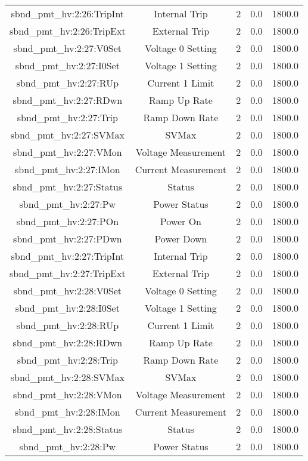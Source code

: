 \begin{center}
\begin{longtable}{c | c c c c }
sbnd\_pmt\_hv:2:26:TripInt & Internal Trip & 2 & 0.0 & 1800.0\\ 
sbnd\_pmt\_hv:2:26:TripExt & External Trip & 2 & 0.0 & 1800.0\\ 
sbnd\_pmt\_hv:2:27:V0Set & Voltage 0 Setting & 2 & 0.0 & 1800.0\\ 
sbnd\_pmt\_hv:2:27:I0Set & Voltage 1 Setting & 2 & 0.0 & 1800.0\\ 
sbnd\_pmt\_hv:2:27:RUp & Current 1 Limit & 2 & 0.0 & 1800.0\\ 
sbnd\_pmt\_hv:2:27:RDwn & Ramp Up Rate & 2 & 0.0 & 1800.0\\ 
sbnd\_pmt\_hv:2:27:Trip & Ramp Down Rate & 2 & 0.0 & 1800.0\\ 
sbnd\_pmt\_hv:2:27:SVMax & SVMax & 2 & 0.0 & 1800.0\\ 
sbnd\_pmt\_hv:2:27:VMon & Voltage Measurement & 2 & 0.0 & 1800.0\\ 
sbnd\_pmt\_hv:2:27:IMon & Current Measurement & 2 & 0.0 & 1800.0\\ 
sbnd\_pmt\_hv:2:27:Status & Status & 2 & 0.0 & 1800.0\\ 
sbnd\_pmt\_hv:2:27:Pw & Power Status & 2 & 0.0 & 1800.0\\ 
sbnd\_pmt\_hv:2:27:POn & Power On & 2 & 0.0 & 1800.0\\ 
sbnd\_pmt\_hv:2:27:PDwn & Power Down & 2 & 0.0 & 1800.0\\ 
sbnd\_pmt\_hv:2:27:TripInt & Internal Trip & 2 & 0.0 & 1800.0\\ 
sbnd\_pmt\_hv:2:27:TripExt & External Trip & 2 & 0.0 & 1800.0\\ 
sbnd\_pmt\_hv:2:28:V0Set & Voltage 0 Setting & 2 & 0.0 & 1800.0\\ 
sbnd\_pmt\_hv:2:28:I0Set & Voltage 1 Setting & 2 & 0.0 & 1800.0\\ 
sbnd\_pmt\_hv:2:28:RUp & Current 1 Limit & 2 & 0.0 & 1800.0\\ 
sbnd\_pmt\_hv:2:28:RDwn & Ramp Up Rate & 2 & 0.0 & 1800.0\\ 
sbnd\_pmt\_hv:2:28:Trip & Ramp Down Rate & 2 & 0.0 & 1800.0\\ 
sbnd\_pmt\_hv:2:28:SVMax & SVMax & 2 & 0.0 & 1800.0\\ 
sbnd\_pmt\_hv:2:28:VMon & Voltage Measurement & 2 & 0.0 & 1800.0\\ 
sbnd\_pmt\_hv:2:28:IMon & Current Measurement & 2 & 0.0 & 1800.0\\ 
sbnd\_pmt\_hv:2:28:Status & Status & 2 & 0.0 & 1800.0\\ 
sbnd\_pmt\_hv:2:28:Pw & Power Status & 2 & 0.0 & 1800.0\\ 

\end{longtable}
\end{center}
